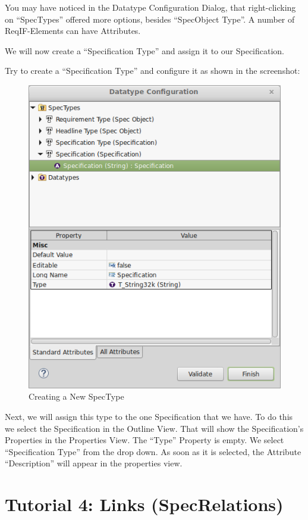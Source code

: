 You may have noticed in the Datatype Configuration Dialog, that right-clicking on ``SpecTypes'' offered more options, besides ``SpecObject Type''.  A number of ReqIF-Elements can have Attributes.

We will now create a ``Specification Type'' and assign it to our Specification.

Try to create a ``Specification Type'' and configure it as shown in the screenshot:

\begin{figure}[h!]
\centering      
\includegraphics[width=0.8\linewidth]{../rmf-images/new_spectype.png}      
\caption{Creating a New SpecType}      
\label{fig:newSpecType}
\end{figure}

Next, we will assign this type to the one Specification that we have.  To do this we select the Specification in the Outline View.  That will show
the Specification's Properties in the Properties View.  The ``Type'' Property is empty.  We select ``Specification Type'' from the drop down.
As soon as it is selected, the Attribute ``Description'' will appear in the properties view.

\section{Tutorial 4: Links (SpecRelations)}

